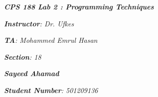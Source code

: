 

\begin{titlepage}
    \begin{center}
        \vspace*{1cm}
            
        \date{}
            
        \huge
            
        \textit{\textbf{CPS 188 Lab 2 : Programming Techniques}}
            
        \vspace{0.25cm}
            
            
        \vspace{2.5cm}
            
		\vspace{0.25cm}
            
            
        \LARGE
            

		\textit{\textbf{Instructor}: Dr. Ufkes}

		\textit{\textbf{TA}: Mohammed Emrul Hasan}

		\textit{\textbf{Section}: 18}

		\vspace{2.5cm}

		\textit{\textbf{Sayeed Ahamad}}
            
            
        \Large         

		\vspace{5cm}

		\vspace{0cm}            
            
		\Large		
		        
		\vspace{0.25cm} 
		
		\textit{\textbf{Student Number}: 501209136}
            
        \vspace{2cm}
            
        \Large
         
		\vspace{0.25cm}                  
            
        \vspace{0.25cm}
           
            
    \end{center}
\end{titlepage}



